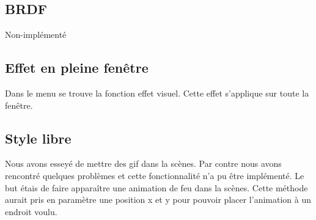 \subsection{BRDF}
Non-implémenté

\subsection{Effet en pleine fenêtre}
Dans le menu se trouve la fonction effet visuel. Cette effet s'applique sur toute la fenêtre. 

\subsection{Style libre}
Nous avons esseyé de mettre des gif dans la scènes. Par contre nous avons rencontré quelques problèmes et cette fonctionnalité n'a pu être implémenté. Le but étais de faire apparaître une animation de feu dans la scènes. Cette méthode aurait pris en paramètre une position x et y pour pouvoir placer l'animation à un endroit voulu. 

